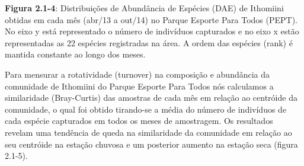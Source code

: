 \textbf{Figura 2.1-4}: Distribuições de Abundância de Espécies (DAE) de Ithomiini obtidas em cada mês (abr/13 a out/14) no Parque Esporte Para Todos (PEPT). No eixo y está representado o número de indivíduos capturados e no eixo x estão representadas as 22 espécies registradas na área. A ordem das espécies (rank) é mantida constante ao longo dos meses.

Para mensurar a rotatividade (turnover) na composição e abundância da comunidade de Ithomiini do Parque Esporte Para Todos nós calculamos a similaridade (Bray-Curtis) das amostras de cada mês em relação ao centróide da comunidade, o qual foi obtido tirando-se a média do número de indivíduos de cada espécie capturados em todos os meses de amostragem. Os resultados revelam uma tendência de queda na similaridade da comunidade em relação ao seu centróide na estação chuvosa e um posterior aumento na estação seca (figura 2.1-5).

